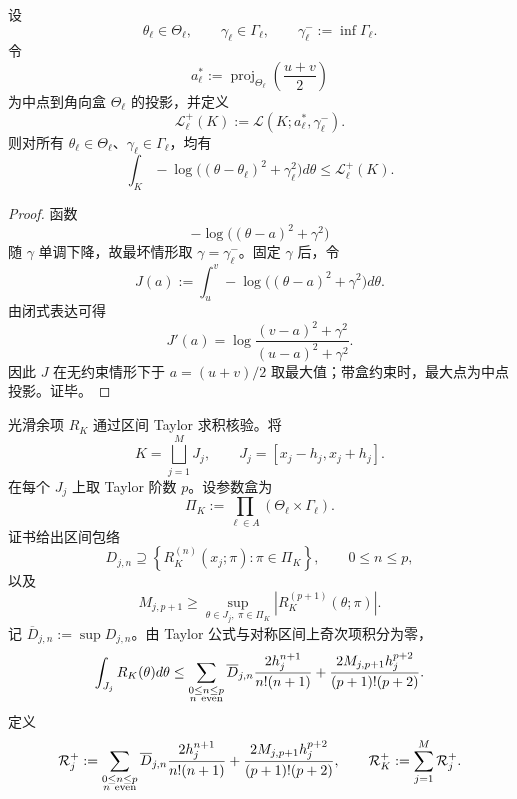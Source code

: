 \begin{lemma}[参数盒下的对数奇性预算]\label{lem:typed-address-biaxial-completion-log-singular-box-budget}
设
\[
\theta_\ell\in\Theta_\ell,
\qquad
\gamma_\ell\in\Gamma_\ell,
\qquad
\gamma_\ell^-:=\inf\Gamma_\ell.
\]
令
\[
a_\ell^*
:=
\operatorname{proj}_{\Theta_\ell}\left(\frac{u+v}{2}\right)
\]
为中点到角向盒 \(\Theta_\ell\) 的投影，并定义
\[
\mathcal L_\ell^+(K)
:=
\mathcal L(K;a_\ell^*,\gamma_\ell^-).
\]
则对所有 \(\theta_\ell\in\Theta_\ell\)、\(\gamma_\ell\in\Gamma_\ell\)，均有
\[
\int_K-\log\bigl((\theta-\theta_\ell)^2+\gamma_\ell^2\bigr)d\theta
\le
\mathcal L_\ell^+(K).
\]
\end{lemma}
\begin{proof}
函数
\[
-\log\bigl((\theta-a)^2+\gamma^2\bigr)
\]
随 \(\gamma\) 单调下降，故最坏情形取 \(\gamma=\gamma_\ell^-\)。固定 \(\gamma\) 后，令
\[
J(a):=\int_u^v-\log\bigl((\theta-a)^2+\gamma^2\bigr)d\theta.
\]
由闭式表达可得
\[
J'(a)
=
\log
\frac{(v-a)^2+\gamma^2}{(u-a)^2+\gamma^2}.
\]
因此 \(J\) 在无约束情形下于 \(a=(u+v)/2\) 取最大值；带盒约束时，最大点为中点投影。证毕。
\end{proof}

光滑余项 \(R_K\) 通过区间 Taylor 求积核验。将
\[
K=\bigsqcup_{j=1}^M J_j,
\qquad
J_j=[x_j-h_j,x_j+h_j].
\]
在每个 \(J_j\) 上取 Taylor 阶数 \(p\)。设参数盒为
\[
\Pi_K:=\prod_{\ell\in A}(\Theta_\ell\times\Gamma_\ell).
\]
证书给出区间包络
\[
D_{j,n}
\supseteq
\left\{
R_K^{(n)}(x_j;\pi):\pi\in\Pi_K
\right\},
\qquad
0\le n\le p,
\]
以及
\[
M_{j,p+1}
\ge
\sup_{\theta\in J_j,\ \pi\in\Pi_K}
\left|R_K^{(p+1)}(\theta;\pi)\right|.
\]
记 \(\overline D_{j,n}:=\sup D_{j,n}\)。由 Taylor 公式与对称区间上奇次项积分为零，
\[
\int_{J_j}R_K(\theta)d\theta
\le
\sum_{\substack{0\le n\le p\\ n\ {\rm even}}}
\overline D_{j,n}
\frac{2h_j^{n+1}}{n!(n+1)}
+
\frac{2M_{j,p+1}h_j^{p+2}}{(p+1)!(p+2)}.
\]
定义
\[
\mathcal R_j^+
:=
\sum_{\substack{0\le n\le p\\ n\ {\rm even}}}
\overline D_{j,n}
\frac{2h_j^{n+1}}{n!(n+1)}
+
\frac{2M_{j,p+1}h_j^{p+2}}{(p+1)!(p+2)},
\qquad
\mathcal R_K^+:=\sum_{j=1}^M\mathcal R_j^+.
\]

